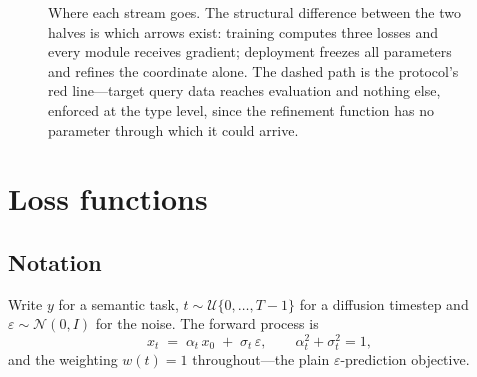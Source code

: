 \documentclass[11pt]{article}
\newcommand{\zS}{z_{S}}
\newcommand{\ztilT}{\tilde{z}_{T}}
\newcommand{\zstarT}{z^{\star}_{T}}
\newcommand{\Dss}{D^{s}_{y,S}}
\newcommand{\Dst}{D^{s}_{y,T}}
\newcommand{\Dqt}{D^{q}_{y,T}}
\begin{document}
\begin{figure}[htbp]
{}

\caption{Where each stream goes. The structural difference between the two halves is which arrows
exist: training computes three losses and every module receives gradient; deployment freezes all
parameters and refines the coordinate alone. The dashed path is the protocol's red line---target
query data reaches evaluation and nothing else, enforced at the type level, since the refinement
function has no parameter through which it could arrive.}
\label{fig:flow}
\end{figure}

\section{Loss functions}
\label{sec:loss}

\subsection{Notation}

Write $y$ for a semantic task, $t\sim\mathcal{U}\{0,\dots,T-1\}$ for a diffusion timestep and
$\varepsilon\sim\mathcal{N}(0,I)$ for the noise. The forward process is
\begin{equation}
x_t \;=\; \alpha_t\,x_0 \;+\; \sigma_t\,\varepsilon,
\qquad \alpha_t^{2}+\sigma_t^{2}=1,
\end{equation}
and the weighting $w(t)=1$ throughout---the plain $\varepsilon$-prediction objective.
\end{document}
